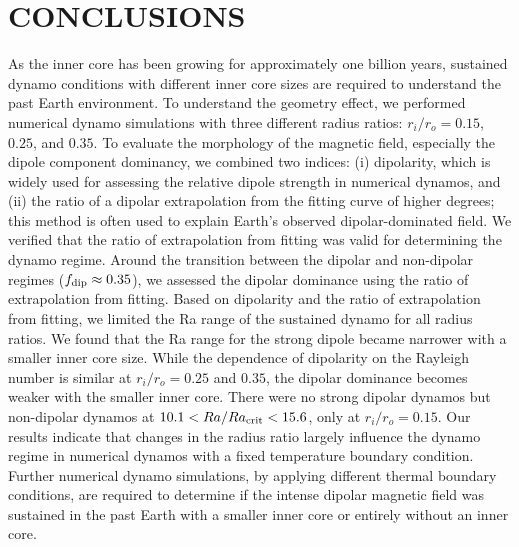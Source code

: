 \section{CONCLUSIONS}

As the inner core has been growing for approximately one billion years, sustained dynamo conditions with different inner core sizes are required to understand the past Earth environment. 
To understand the geometry effect, we performed numerical dynamo simulations with three different radius ratios: $r_i/r_o = 0.15$, $0.25$, and $0.35$. 
To evaluate the morphology of the magnetic field, especially the dipole component dominancy, we combined two indices: (i) dipolarity, which is widely used for assessing the relative dipole strength in numerical dynamos, and (ii) the ratio of a dipolar extrapolation from the fitting curve of higher degrees; this method is often used to explain Earth’s observed dipolar-dominated field. 
We verified that the ratio of extrapolation from fitting was valid for determining the dynamo regime. Around the transition between the dipolar and non-dipolar regimes ($f_{\rm dip} \approx 0.35$), we assessed the dipolar dominance using the ratio of extrapolation from fitting. 
Based on dipolarity and the ratio of extrapolation from fitting, we limited the Ra range of the sustained dynamo for all radius ratios. 
We found that the Ra range for the strong dipole became narrower with a smaller inner core size. While the dependence of dipolarity on the Rayleigh number is similar at $r_i/r_o = 0.25$ and $0.35$, the dipolar dominance becomes weaker with the smaller inner core. 
There were no strong dipolar dynamos but non-dipolar dynamos at $10.1 < Ra/Ra_{\rm crit} < 15.6$, only at $r_i/r_o = 0.15$. 
Our results indicate that changes in the radius ratio largely influence the dynamo regime in numerical dynamos with a fixed temperature boundary condition. 
Further numerical dynamo simulations, by applying different thermal boundary conditions, are required to determine if the intense dipolar magnetic field was sustained in the past Earth with a smaller inner core or entirely without an inner core.
